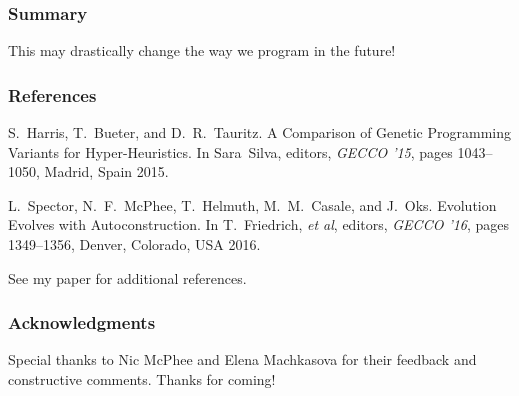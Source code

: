 \documentclass{beamer}
\newcommand{\linespace}{\vskip 0.25cm}
\begin{document}
\begin{frame}
	\frametitle{Summary}
	\centering
	\large This may drastically change the way we program in the future!
\end{frame}

\begin{frame} 
	\frametitle{References} 
	
	\begin{thebibliography}{lskdjf}
		
		S.~Harris, T.~Bueter, and D.~R.~Tauritz.
		\newblock A Comparison of Genetic Programming Variants for Hyper-Heuristics.
		\newblock In Sara~Silva, editors, {\em GECCO '15}, pages 1043--1050, Madrid, Spain 2015.
		
		L.~Spector, N.~F.~McPhee, T.~Helmuth, M.~M.~Casale, and J.~Oks.
		\newblock Evolution Evolves with Autoconstruction.
		\newblock In T.~Friedrich, \emph{et al}, editors, {\em GECCO '16}, pages 1349--1356, Denver, Colorado, USA 2016.
		
	\end{thebibliography}
	\linespace
	\begin{center}
		See my paper for additional references.
	\end{center}
\end{frame} 

\begin{frame}
	\frametitle{Acknowledgments}
	\centering
	Special thanks to Nic McPhee and Elena Machkasova for their feedback and constructive comments.
	\linespace
	\linespace
	\large Thanks for coming!
\end{frame}
\end{document}
